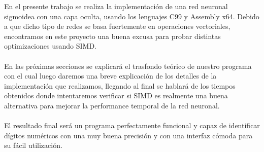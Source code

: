 
En el presente trabajo se realiza la implementación de una red neuronal sigmoidea con una capa oculta, usando los lenguajes C99 y Assembly x64. Debido a que dicho tipo de redes se basa fuertemente en operaciones vectoriales, encontramos en este proyecto una buena excusa para probar distintas optimizaciones usando SIMD.
\\
\\
En las próximas secciones se explicará el trasfondo teórico de nuestro programa con el cual luego daremos una breve explicación de los detalles de la implementación que realizamos, llegando al final se hablará de los tiempos obtenidos donde intentaremos verificar si SIMD es realmente una buena alternativa para mejorar la performance temporal de la red neuronal.\\
\\
El resultado final será un programa perfectamente funcional y capaz de identificar dígitos numéricos con una muy buena precisión y con una interfaz cómoda para su fácil utilización.